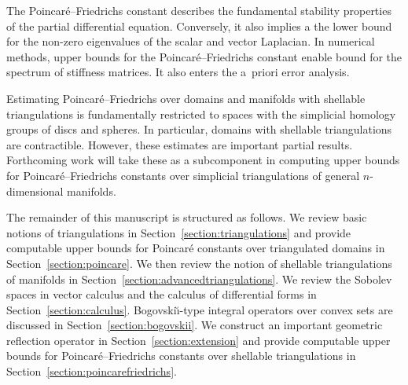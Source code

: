 \documentclass[a4paper]{article}
\begin{document}
The Poincar\'e--Friedrichs constant describes the fundamental stability properties of the partial differential equation. 
Conversely, it also implies a the lower bound for the non-zero eigenvalues of the scalar and vector Laplacian.
In numerical methods, upper bounds for the Poincar\'e--Friedrichs constant enable bound for the spectrum of stiffness matrices. 
It also enters the a~priori error analysis. 

Estimating Poincar\'e--Friedrichs over domains and manifolds with shellable triangulations is fundamentally restricted to spaces with the simplicial homology groups of discs and spheres. In particular, domains with shellable triangulations are contractible. However, these estimates are important partial results. Forthcoming work will take these as a subcomponent in computing upper bounds for Poincar\'e--Friedrichs constants over simplicial triangulations of general $n$-dimensional manifolds. 




The remainder of this manuscript is structured as follows.
We review basic notions of triangulations in Section~\ref{section:triangulations} and provide computable upper bounds for Poincar\'e constants over triangulated domains in Section~\ref{section:poincare}.
We then review the notion of shellable triangulations of manifolds in Section~\ref{section:advancedtriangulations}.
We review the Sobolev spaces in vector calculus and the calculus of differential forms in Section~\ref{section:calculus}.
Bogovski\u{\i}-type integral operators over convex sets are discussed in Section~\ref{section:bogovskii}.
We construct an important geometric reflection operator in Section~\ref{section:extension}
and provide computable upper bounds for Poincar\'e--Friedrichs constants over shellable triangulations in Section~\ref{section:poincarefriedrichs}.






\end{document}
